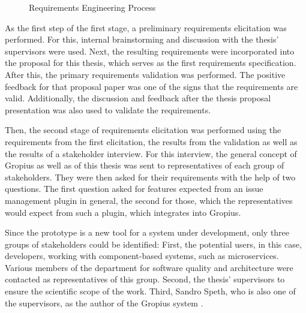 \begin{figure}[!h]
	\caption{Requirements Engineering Process}
	\label{fig:requirmentsProcess}
\end{figure}

As the first step of the first stage, a preliminary requirements elicitation was performed. 
For this, internal brainstorming and discussion with the thesis' supervisors were used.
Next, the resulting requirements were incorporated into the proposal for this thesis, 
which serves as the first requirements specification.
After this, the primary requirements validation was performed. 
The positive feedback for that proposal paper was one of the signs that the requirements are valid.
Additionally, the discussion and feedback after the thesis proposal presentation was also used to validate the requirements.

Then, the second stage of requirements elicitation was performed using the requirements from the first elicitation, 
the results from the validation as well as the results of a stakeholder interview.
For this interview, the general concept of Gropius as well as of this thesis was sent to representatives of each group of stakeholders. 
They were then asked for their requirements with the help of two questions.
The first question asked for features expected from an issue management plugin in general,
the second for those, which the representatives would expect from such a plugin, which integrates into \gls{Gropius}.

Since the prototype is a new tool for a system under development, only three groups of stakeholders could be identified:
First, the potential users, in this case, developers, working with component-based systems, such as microservices.
Various members of the department for software quality and architecture were contacted as representatives of this group.
Second, the thesis' supervisors to ensure the scientific scope of the work. 
Third, Sandro Speth, who is also one of the supervisors, as the author of the \gls{Gropius} system \cite{speth2020gropius}.

